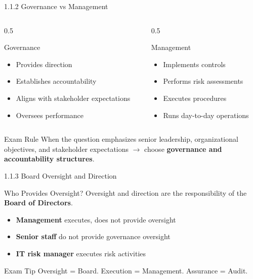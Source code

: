 \documentclass{beamer}
\begin{document}
	\begin{frame}{1.1.2 Governance vs Management}
		\begin{columns}
			\begin{column}{0.5\textwidth}
				\begin{block}{Governance}
					\begin{itemize}
						\item Provides direction
						\item Establishes accountability
						\item Aligns with stakeholder expectations
						\item Oversees performance
					\end{itemize}
				\end{block}
			\end{column}
			\begin{column}{0.5\textwidth}
				\begin{block}{Management}
					\begin{itemize}
						\item Implements controls
						\item Performs risk assessments
						\item Executes procedures
						\item Runs day-to-day operations
					\end{itemize}
				\end{block}
			\end{column}
		\end{columns}
		\begin{exampleblock}{Exam Rule}
			When the question emphasizes senior leadership, organizational objectives, and stakeholder expectations $\rightarrow$ choose \textbf{governance and accountability structures}.
		\end{exampleblock}
	\end{frame}
	
	\begin{frame}{1.1.3 Board Oversight and Direction}
		\begin{block}{Who Provides Oversight?}
			Oversight and direction are the responsibility of the \textbf{Board of Directors}.
		\end{block}
		\begin{itemize}
			\item \textbf{Management} executes, does not provide oversight
			\item \textbf{Senior staff} do not provide governance oversight
			\item \textbf{IT risk manager} executes risk activities
		\end{itemize}
		\begin{alertblock}{Exam Tip}
			Oversight = Board. Execution = Management. Assurance = Audit.
		\end{alertblock}
	\end{frame}
	
\end{document}

